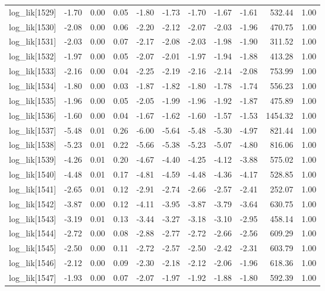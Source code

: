 \begin{table}[ht]
\begin{tabular}{rrrrrrrrrrr}
  log\_lik[1529] & -1.70 & 0.00 & 0.05 & -1.80 & -1.73 & -1.70 & -1.67 & -1.61 & 532.44 & 1.00 \\ 
  log\_lik[1530] & -2.08 & 0.00 & 0.06 & -2.20 & -2.12 & -2.07 & -2.03 & -1.96 & 470.75 & 1.00 \\ 
  log\_lik[1531] & -2.03 & 0.00 & 0.07 & -2.17 & -2.08 & -2.03 & -1.98 & -1.90 & 311.52 & 1.00 \\ 
  log\_lik[1532] & -1.97 & 0.00 & 0.05 & -2.07 & -2.01 & -1.97 & -1.94 & -1.88 & 413.28 & 1.00 \\ 
  log\_lik[1533] & -2.16 & 0.00 & 0.04 & -2.25 & -2.19 & -2.16 & -2.14 & -2.08 & 753.99 & 1.00 \\ 
  log\_lik[1534] & -1.80 & 0.00 & 0.03 & -1.87 & -1.82 & -1.80 & -1.78 & -1.74 & 556.23 & 1.00 \\ 
  log\_lik[1535] & -1.96 & 0.00 & 0.05 & -2.05 & -1.99 & -1.96 & -1.92 & -1.87 & 475.89 & 1.00 \\ 
  log\_lik[1536] & -1.60 & 0.00 & 0.04 & -1.67 & -1.62 & -1.60 & -1.57 & -1.53 & 1454.32 & 1.00 \\ 
  log\_lik[1537] & -5.48 & 0.01 & 0.26 & -6.00 & -5.64 & -5.48 & -5.30 & -4.97 & 821.44 & 1.00 \\ 
  log\_lik[1538] & -5.23 & 0.01 & 0.22 & -5.66 & -5.38 & -5.23 & -5.07 & -4.80 & 816.06 & 1.00 \\ 
  log\_lik[1539] & -4.26 & 0.01 & 0.20 & -4.67 & -4.40 & -4.25 & -4.12 & -3.88 & 575.02 & 1.00 \\ 
  log\_lik[1540] & -4.48 & 0.01 & 0.17 & -4.81 & -4.59 & -4.48 & -4.36 & -4.17 & 528.85 & 1.00 \\ 
  log\_lik[1541] & -2.65 & 0.01 & 0.12 & -2.91 & -2.74 & -2.66 & -2.57 & -2.41 & 252.07 & 1.00 \\ 
  log\_lik[1542] & -3.87 & 0.00 & 0.12 & -4.11 & -3.95 & -3.87 & -3.79 & -3.64 & 630.75 & 1.00 \\ 
  log\_lik[1543] & -3.19 & 0.01 & 0.13 & -3.44 & -3.27 & -3.18 & -3.10 & -2.95 & 458.14 & 1.00 \\ 
  log\_lik[1544] & -2.72 & 0.00 & 0.08 & -2.88 & -2.77 & -2.72 & -2.66 & -2.56 & 609.29 & 1.00 \\ 
  log\_lik[1545] & -2.50 & 0.00 & 0.11 & -2.72 & -2.57 & -2.50 & -2.42 & -2.31 & 603.79 & 1.00 \\ 
  log\_lik[1546] & -2.12 & 0.00 & 0.09 & -2.30 & -2.18 & -2.12 & -2.06 & -1.96 & 618.36 & 1.00 \\ 
  log\_lik[1547] & -1.93 & 0.00 & 0.07 & -2.07 & -1.97 & -1.92 & -1.88 & -1.80 & 592.39 & 1.00 \\ 

\end{tabular}
\end{table}
